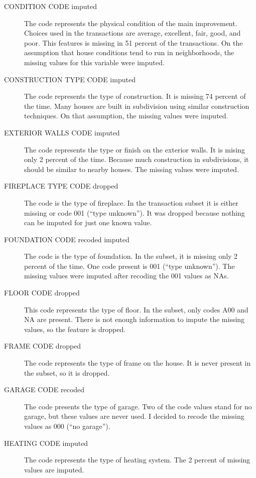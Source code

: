 \begin{description}
\item[CONDITION CODE imputed] The code represents the physical condition of
  the main improvement. Choices used in the transactions are average,
  excellent, fair, good, and poor. This features is missing in 51
  percent of the transactions. On the assumption that house conditions
  tend to run in neighborhoods, the missing values for this variable
  were imputed.

\item[CONSTRUCTION TYPE CODE imputed] The code represents the type of
  construction. It is missing 74 percent of the time. Many houses are
  built in subdivision using similar construction techniques. On that
  assumption, the missing values were imputed.

\item[EXTERIOR WALLS CODE imputed] The code represents the type or
  finish on the exterior walls. It is mising only 2 percent of the
  time. Because much construction in subdivisions, it should be
  similar to nearby houses. The missing values were imputed.

\item[FIREPLACE TYPE CODE dropped] The code is the type of
  fireplace. In the transaction subset it is either missing or code
  001 (``type unknown''). It was dropped because nothing can be
  imputed for just one known value.

\item[FOUNDATION CODE recoded imputed] The code is the type of
  foundation. In the subset, it is missing only 2 percent of the
  time. One code present is 001 (``type unknown''). The missing values
  were imputed after recoding the 001 values as NAs.

\item[FLOOR CODE dropped] This code represents the type of floor. In the
  subset, only codes A00 and NA are present. There is not enough
  information to impute the missing values, so the feature is dropped.

\item[FRAME CODE dropped] The code represents the type of frame on the
  house. It is never present in the subset, so it is dropped.

\item[GARAGE CODE recoded] The code presents the type of garage. Two of the
  code values stand for no garage, but these values are never used. I
  decided to recode the missing values as 000 (``no garage'').

\item[HEATING CODE imputed] The code represents the type of heating
  system. The 2 percent of missing values are imputed.


\end{description}
